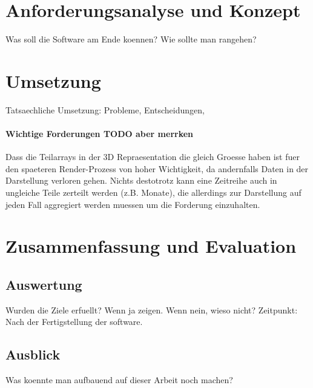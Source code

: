 \documentclass[12pt]{article}
\begin{document}
\section{Anforderungsanalyse und Konzept}
	Was soll die Software am Ende koennen? Wie sollte man rangehen?
\section{Umsetzung}
	Tatsaechliche Umsetzung: Probleme, Entscheidungen, 
	
				\paragraph{Wichtige Forderungen TODO aber merrken}
				Dass die Teilarrays in der 3D Repraesentation die gleich Groesse haben ist fuer den spaeteren Render-Prozess von hoher Wichtigkeit, da andernfalls Daten in der Darstellung verloren gehen. Nichts destotrotz kann eine Zeitreihe auch in ungleiche Teile zerteilt werden (z.B. Monate), die allerdings zur Darstellung auf jeden Fall aggregiert werden muessen um die Forderung einzuhalten.
\section{Zusammenfassung und Evaluation}
	\subsection{Auswertung}
		Wurden die Ziele erfuellt? Wenn ja zeigen. Wenn nein, wieso nicht?
		Zeitpunkt: Nach der Fertigstellung der software.
	\subsection{Ausblick}
		Was koennte man aufbauend auf dieser Arbeit noch machen?
\end{document}
